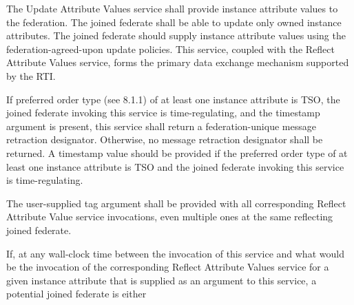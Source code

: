 \begin{compactstdpage}
    The Update Attribute Values service shall provide instance attribute values to the federation. The joined federate shall be able to update only owned instance attributes. The joined federate should supply instance attribute values using the federation-agreed-upon update policies. This service, coupled with the Reflect Attribute Values \rtiinitiated{} service, forms the primary data exchange mechanism supported by the RTI.


    If preferred order type (see 8.1.1) of at least one instance attribute is TSO, the joined federate invoking this service is time-regulating, and the timestamp argument is present, this service shall return a federation-unique message retraction designator. Otherwise, no message retraction designator shall be returned. A timestamp value should be provided if the preferred order type of at least one instance attribute is TSO and the joined federate invoking this service is time-regulating.


    The user-supplied tag argument shall be provided with all corresponding Reflect Attribute Value \rtiinitiated{} service invocations, even multiple ones at the same reflecting joined federate.


    If, at any wall-clock time between the invocation of this service and what would be the invocation of the corresponding Reflect Attribute Values \rtiinitiated{} service for a given instance attribute that is supplied as an argument to this service, a potential joined federate is either



\end{compactstdpage}

\clearpage

